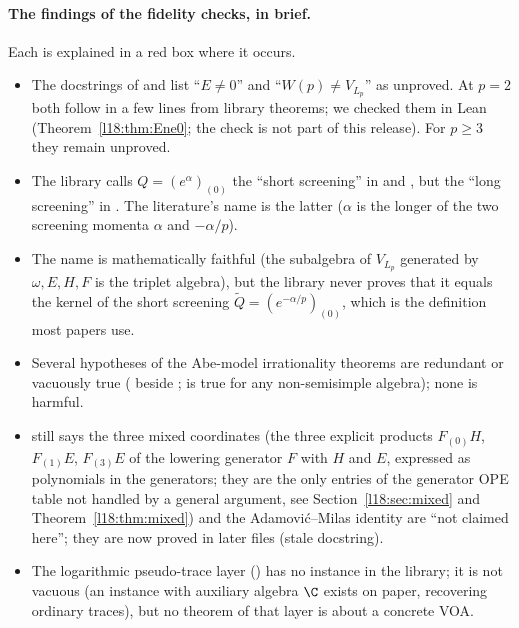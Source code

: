 \paragraph{The findings of the fidelity checks, in brief.} Each is explained in a red box where it
occurs.
\begin{itemize}
\item The docstrings of  and  list ``$E\ne0$''
  and ``$W(p)\ne V_{L_p}$'' as unproved. At $p=2$ both follow in a few lines from library theorems;
  we checked them in Lean (Theorem~\ref{l18:thm:Ene0};
  the check is not part of this release). For $p\ge3$ they remain unproved.
\item The library calls $Q=(e^{\alpha})_{(0)}$ the ``short screening'' in
   and , but the ``long screening'' in
  . The literature's name is the latter ($\alpha$ is the longer of the two
  screening momenta $\alpha$ and $-\alpha/p$).
\item The name  is mathematically faithful (the subalgebra of $V_{L_p}$
  generated by $\omega,E,H,F$ is the triplet algebra), but the library never proves that it equals
  the kernel of the short screening $\widetilde Q=(e^{-\alpha/p})_{(0)}$, which is the definition
  most papers use.
\item Several hypotheses of the Abe-model irrationality theorems are redundant or vacuously true
  ( beside ;  is true for any
  non-semisimple algebra); none is harmful.
\item {} still says the three mixed coordinates (the three
  explicit products $F_{(0)}H$, $F_{(1)}E$, $F_{(3)}E$ of the lowering generator $F$ with $H$ and $E$,
  expressed as polynomials in the generators; they are the only entries of the generator OPE table
  not handled by a general argument, see Section~\ref{l18:sec:mixed} and Theorem~\ref{l18:thm:mixed})
  and the Adamovi\'c--Milas identity are ``not claimed here''; they are now proved in later files
  (stale docstring).
\item The logarithmic pseudo-trace layer () has no instance in
  the library; it is not vacuous (an instance with auxiliary algebra $\C$ exists on paper, recovering
  ordinary traces), but no theorem of that layer is about a concrete VOA.
\end{itemize}

